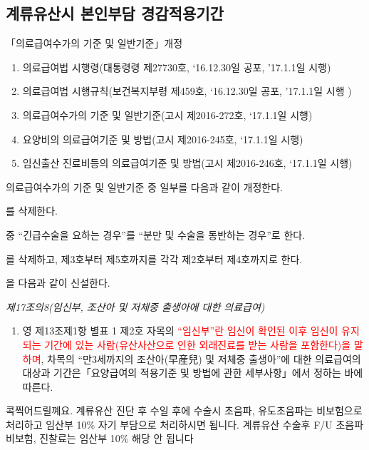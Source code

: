 \subsection{계류유산시 본인부담 경감적용기간}
\begin{commentbox}{「의료급여수가의 기준 및 일반기준」개정}
\begin{enumerate}[1)]\tightlist
\item 의료급여법 시행령(대통령령 제27730호, ‘16.12.30일 공포, ’17.1.1일 시행)
\item 의료급여법 시행규칙(보건복지부령 제459호, ‘16.12.30일 공포, ’17.1.1일 시행 )
\item 의료급여수가의 기준 및 일반기준(고시 제2016-272호, ‘17.1.1일 시행)
\item 요양비의 의료급여기준 및 방법(고시 제2016-245호, ‘17.1.1일 시행)
\item 임신\cntrdot{}출산 진료비등의 의료급여기준 및 방법(고시 제2016-246호, ‘17.1.1일 시행)
\end{enumerate}

의료급여수가의 기준 및 일반기준 중 일부를 다음과 같이 개정한다.
\begin{description}\tightlist
\item[제4조]를 삭제한다.
\item[제5조제1항제1호] 중 “긴급수술을 요하는 경우”를 “분만 및 수술을 동반하는 경우”로 한다. 
\item[제5조제1항제2호] 를 삭제하고, 제3호부터 제5호까지를 각각 제2호부터 제4호까지로 한다.
\item[제17조의8]을 다음과 같이 신설한다.
\end{description}
\emph{제17조의8(임신부, 조산아 및 저체중 출생아에 대한 의료급여)}
\begin{enumerate}[①]\tightlist
\item 영 제13조제1항 별표 1 제2호 자목의 \textcolor{red}{“임신부”란 임신이 확인된 이후 임신이 유지되는 기간에 있는 사람(유산\cntrdot{}사산으로 인한 외래진료를 받는 사람을 포함한다)을 말하며}, 차목의 “만3세까지의 조산아(早産兒) 및 저체중 출생아”에 대한 의료급여의 대상과 기간은「요양급여의 적용기준 및 방법에 관한 세부사항」에서 정하는 바에 따른다.
\end{enumerate}
\end{commentbox}
\prezi{\clearpage} 
\prezi{\clearpage}
\prezi{\clearpage}
\begin{commentbox}{콕찍어드릴꼐요.}
계류유산 진단 후 수일 후에 수술시 초음파, 유도초음파는 비보험으로 처리하고 임산부 10\% 자기 부담으로 처리하시면 됩니다. 계류유산 수술후 F/U 초음파  비보험, 진찰료는 임산부 10\% 해당 안 됩니다
\end{commentbox}
